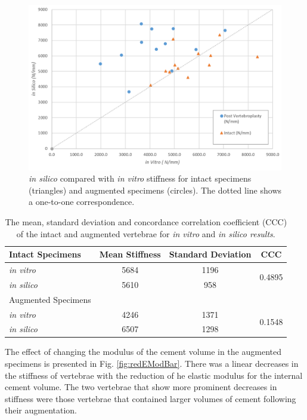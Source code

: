 \begin{figure}[ht]
\centering
\includegraphics[width=\textwidth]{images/exp_vs_comp_both.png}
\caption{\textit{in silico} compared with \textit{in vitro} stiffness for intact specimens (triangles) and augmented specimens (circles). The dotted line shows a one-to-one correspondence.}
\label{fig:compvexpscatter}
\end{figure}

\begin{table}[ht]
\centering
\caption{The mean, standard deviation and concordance correlation coefficient (CCC) of the intact and augmented vertebrae for \textit{in vitro} and \textit{in silico results}.}
\label{tab:int}
\begin{tabular}{l|c|c|c}
     Intact Specimens     & Mean Stiffness & Standard Deviation & CCC                     \\ \hline \hline
\textit{in vitro}  & 5684 & 1196             & \multirow{2}{*}{0.4895} \\
\textit{in silico} & 5610 & 958               &                        \\
\hline
 Augmented Specimens
 \\ \hline \hline
\textit{in vitro}  & 4246 & 1371               & \multirow{2}{*}{0.1548} \\
\textit{in silico} & 6507 & 1298               &                      \\ \hline
\end{tabular}
\end{table}

The effect of changing the modulus of the cement volume in the augmented specimens is presented in Fig. \ref{fig:redEModBar}. There was a linear decreases in the stiffness of vertebrae with the reduction of he elastic modulus for the internal cement volume. The two vertebrae that show more prominent decreases in stiffness were those vertebrae that contained larger volumes of cement following their augmentation.

